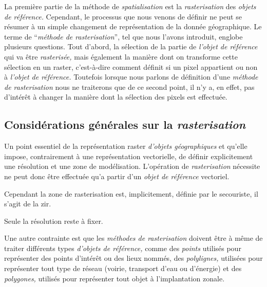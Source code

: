 La première partie de la méthode de \emph{spatialisation} est la
\emph{rasterisation} des \emph{objets de référence.} Cependant, le
processus que nous venons de définir ne peut se résumer à un simple
changement de représentation de la donnée géographique. Le terme de
\enquote{\emph{méthode de rasterisation}}, tel que nous l'avons
introduit, englobe plusieurs questions. Tout d'abord, la sélection de
la partie de \emph{l'objet de référence} qui va être
\emph{rasterisée,} mais également la manière dont on transforme cette
sélection en un raster, c'est-à-dire comment définit si un pixel
appartient ou non à \emph{l'objet de référence.} Toutefois lorsque
nous parlons de définition d'une \emph{méthode de rasterisation} nous
ne traiterons que de ce second point, il n'y a, en effet, pas
d’intérêt à changer la manière dont la sélection des pixels est
effectuée.

\subsection{Considérations générales sur la \emph{rasterisation}}

Un point essentiel de la représentation raster \emph{d'objets
  géographiques} et qu'elle impose, contrairement à une représentation
vectorielle, de définir explicitement une résolution et une zone de
modélisation. L'opération de \emph{rasterisation} nécessite ne peut
donc être effectuée qu'a partir d'un \emph{objet de référence}
vectoriel.

Cependant la zone de rasterisation est, implicitement, définie par le
secouriste, il s'agit de la \ac{zir}.

Seule la résolution reste à fixer.


Une autre contrainte est que les \emph{méthodes de rasterisation}
doivent être à même de traiter différents types \emph{d'objets de
  référence,} comme des \emph{points} utilisés pour représenter des
points d’intérêt ou des lieux nommés, des \emph{polylignes,} utilisées
pour représenter tout type de réseau (\eg voirie, transport d'eau ou
d'énergie) et des \emph{polygones,} utilisés pour représenter tout
objet à l’implantation zonale.

